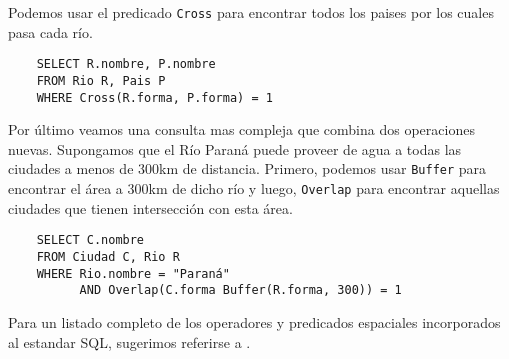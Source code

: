 Podemos usar el predicado \texttt{Cross} para encontrar todos los paises por los cuales pasa cada río.

\begin{verbatim}
    SELECT R.nombre, P.nombre
    FROM Rio R, Pais P
    WHERE Cross(R.forma, P.forma) = 1
\end{verbatim}

Por último veamos una consulta mas compleja que combina dos operaciones nuevas. Supongamos que el Río Paraná puede proveer de agua a todas las ciudades a menos de 300km de distancia. Primero, podemos usar \texttt{Buffer} para encontrar el área a 300km de dicho río y luego, \texttt{Overlap} para encontrar aquellas ciudades que tienen intersección con esta área.

\begin{verbatim}
    SELECT C.nombre
    FROM Ciudad C, Rio R
    WHERE Rio.nombre = "Paraná"
          AND Overlap(C.forma Buffer(R.forma, 300)) = 1
\end{verbatim}

Para un listado completo de los operadores y predicados espaciales incorporados al estandar SQL, sugerimos referirse a \cite{99opengis}.




